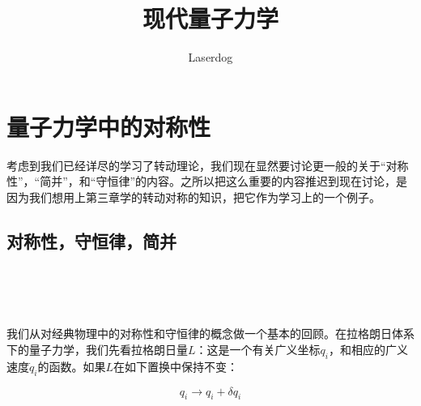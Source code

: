 \documentclass[UTF8,twoside]{ctexart}
\begin{document}
\setcounter{section}{3}
\title{现代量子力学}
\author{Laserdog}

\maketitle
\thispagestyle{empty}

\cleardoublepage
{}
\tableofcontents
\clearpage
\section{量子力学中的对称性}

\noindent 考虑到我们已经详尽的学习了转动理论，我们现在显然要讨论更一般的关于“对称性”，“简并”，和“守恒律”的内容。之所以把这么重要的内容推迟到现在讨论，是因为我们想用上第三章学的转动对称的知识，把它作为学习上的一个例子。
\subsection{对称性，守恒律，简并}


\noindent \\

\noindent {}  \\

\



\noindent 我们从对经典物理中的对称性和守恒律的概念做一个基本的回顾。在拉格朗日体系下的量子力学，我们先看拉格朗日量$L$：这是一个有关广义坐标$q_i$，和相应的广义速度$\dot{q}_i$的函数。如果$L$在如下置换中保持不变：

\begin{equation} \label{4.1.1}
q_i\rightarrow q_i + \delta q_i
\end{equation}
\end{document}
